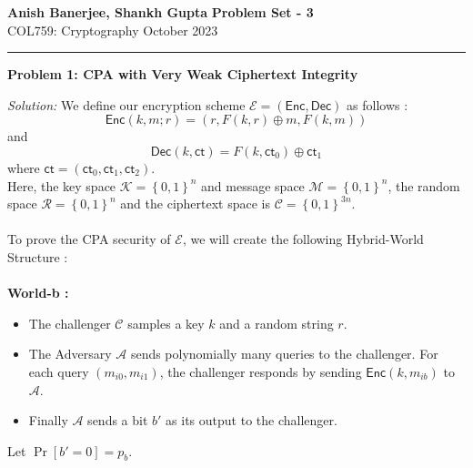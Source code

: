 \documentclass[a4paper, 11pt]{article}
\newcommand{\hr}{\noindent\rule{7in}{2.8pt}}
\newenvironment{solution}
    {\textit{Solution:}}
    {\clearpage}
\newcommand{\prob}[1]{\begin{mdframed}[backgroundcolor=gray!20] \textbf{Problem #1}\end{mdframed}}
\newcommand{\bit}{\left\{0, 1\right\}}
\newcommand{\ct}{\mathsf{ct}}
\newcommand{\enc}{\mathsf{Enc}}
\newcommand{\calA}{\mathcal{A}}
\newcommand{\calC}{\mathcal{C}}
\newcommand{\calE}{\mathcal{E}}
\newcommand{\calK}{\mathcal{K}}
\newcommand{\calM}{\mathcal{M}}
\newcommand{\calR}{\mathcal{R}}
\newcommand{\calT}{\mathcal{T}}
\begin{document}
\noindent
\large\textbf{Anish Banerjee, Shankh Gupta} \hfill \textbf{Problem Set - 3}   \\
\normalsize COL759: Cryptography \hfill October 2023\\
\hr


\prob{1: CPA with Very Weak Ciphertext Integrity}
\begin{solution}
    We define our encryption scheme $\calE = (\mathsf{Enc, Dec})$  as follows :
    $$\mathsf{Enc}(k, m; r) = (r, F(k, r) \oplus m, F(k, m))$$ and
    $$\mathsf{Dec}(k, \ct) = F(k, \ct_0) \oplus \ct_1$$ where $\ct = (\ct_0, \ct_1, \ct_2)$. \\
    Here, the key space $\calK = \bit^n$ and message space $\calM = \bit^n$, the random space $\calR = \bit^n$ and the ciphertext space is $\calC = \bit^{3n}$. \\ \\
    To prove the CPA security of $\calE$, we will create the following Hybrid-World Structure : \\ \\
    \textbf{World-b :}
    \begin{itemize}
        \item The challenger $\calC$ samples a key $k$ and a random string $r$.
        \item The Adversary $\calA$ sends polynomially many queries to the challenger. For each query $(m_{i0}, m_{i1})$, the challenger responds by sending $\enc(k, m_{ib})$ to $\calA$.
        \item Finally $\calA$ sends a bit $b'$ as its output to the challenger.
    \end{itemize}
    Let $\Pr[b' = 0] = p_b$. \\ \\

\end{solution}
\end{document}
